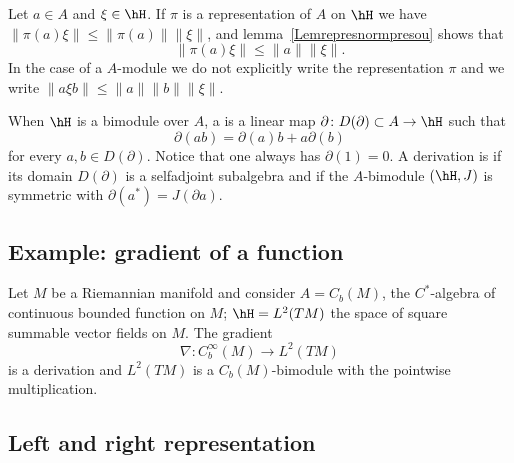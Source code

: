 Let \(a\in A\) and \(\xi\in \hH\). If \(\pi\) is a representation of \(A\) on \(\hH\) we have \(\| \pi(a)\xi \|\leq\| \pi(a) \|\| \xi \|\), and lemma~\ref{Lemrepresnormpresou} shows that
\begin{equation}        \label{Eqpiaxileqanormxi}
    \| \pi(a)\xi \|\leq \| a \|\| \xi \|.
\end{equation}
In the case of a \(A\)-module we do not explicitly write the representation \(\pi\) and we write \(\| a \xi b\|\leq\| a \|\| b \|\| \xi \|\).

When $\hH$ is a bimodule over $A$, a  is a linear map $\partial\colon D(\partial)\subset A\to \hH$ such that
\begin{equation}
	\partial(ab)=\partial(a)b+a\partial(b)
\end{equation}
for every $a,b\in D(\partial)$. Notice that one always has \(\partial(1)=0\). A derivation is  if its domain $D(\partial)$ is a selfadjoint subalgebra and if the $A$-bimodule $(\hH,J)$ is symmetric with $\partial(a^*)=J(\partial a)$.

\subsection{Example: gradient of a function}

Let $M$ be a Riemannian manifold and consider $A=C_b(M)$, the $C^*$-algebra of continuous bounded function on $M$; $\hH=L^2(TM)$ the space of square summable vector fields on $M$. The gradient
\begin{equation}
	\nabla\colon C^{\infty}_b(M)\to L^2(TM)
\end{equation}
is a derivation and $L^2(TM)$ is a $C_b(M)$-bimodule with the pointwise multiplication.

\subsection{Left and right representation}

